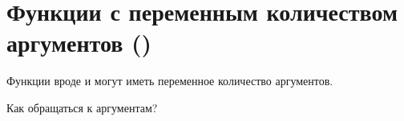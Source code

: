 \chapter{Функции с переменным количеством аргументов ()}

Функции вроде \printf и \scanf могут иметь переменное количество аргументов.

Как обращаться к аргументам?



